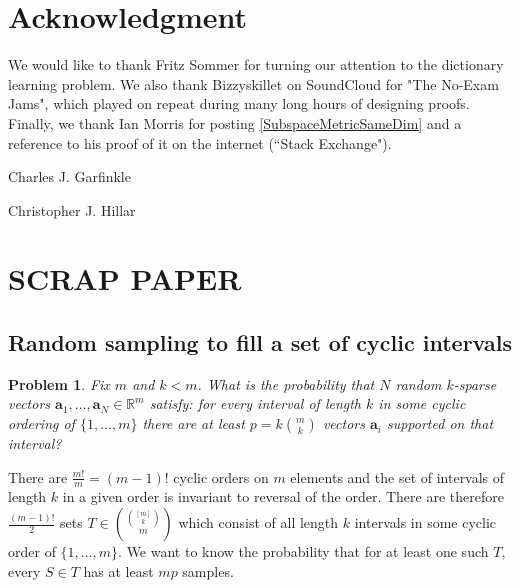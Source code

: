\documentclass[journal, onecolumn]{IEEEtran}
\newtheorem{problem}{Problem}
\begin{document}

\section*{Acknowledgment}
We would like to thank Fritz Sommer for turning our attention to the dictionary learning problem. We also thank Bizzyskillet on SoundCloud for "The No-Exam Jams", which played on repeat during many long hours of designing proofs. Finally, we thank Ian Morris for posting \eqref{SubspaceMetricSameDim} and a reference to his proof of it on the internet (``Stack Exchange").






\begin{IEEEbiographynophoto}{Charles J. Garfinkle}
\end{IEEEbiographynophoto}

\begin{IEEEbiographynophoto}{Christopher J. Hillar}
\end{IEEEbiographynophoto}


\section*{SCRAP PAPER}

\subsection{ Random sampling to fill a set of cyclic intervals }
\begin{problem}
Fix $m$ and $k < m$. What is the probability that $N$ random $k$-sparse vectors $\mathbf{a}_1, \ldots, \mathbf{a}_N \in \mathbb{R}^m$ satisfy: for every interval of length $k$ in some cyclic ordering of $\{1, \ldots, m\}$ there are at least $p = k{m \choose k}$ vectors $\mathbf{a}_i$ supported on that interval?
\end{problem}

There are $\frac{m!}{m} = (m-1)!$ cyclic orders on $m$ elements and the set of intervals of length $k$ in a given order is invariant to reversal of the order. There are therefore $\frac{(m-1)!}{2}$ sets $T \in { {[m] \choose k} \choose m}$ which consist of all length $k$ intervals in some cyclic order of $\{1, \ldots, m\}$. We want to know the probability that for at least one such $T$, every $S \in T$ has at least $mp$ samples.
\end{document}
